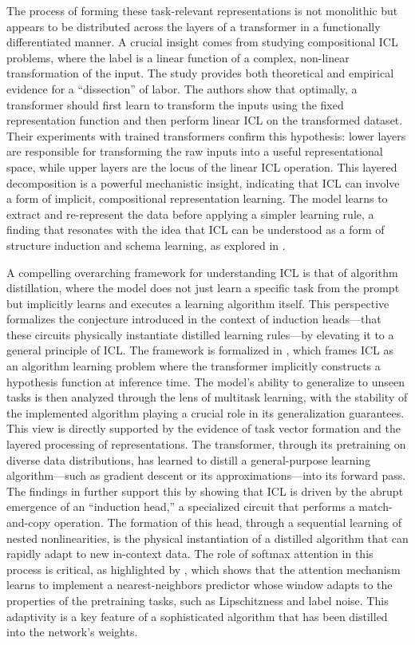 \documentclass[11pt]{article}
\begin{document}
The process of forming these task-relevant representations is not monolithic but appears to be distributed across the layers of a transformer in a functionally differentiated manner. A crucial insight comes from studying compositional ICL problems, where the label is a linear function of a complex, non-linear transformation of the input. The study \cite{ref63} provides both theoretical and empirical evidence for a ``dissection'' of labor. The authors show that optimally, a transformer should first learn to transform the inputs using the fixed representation function and then perform linear ICL on the transformed dataset. Their experiments with trained transformers confirm this hypothesis: lower layers are responsible for transforming the raw inputs into a useful representational space, while upper layers are the locus of the linear ICL operation. This layered decomposition is a powerful mechanistic insight, indicating that ICL can involve a form of implicit, compositional representation learning. The model learns to extract and re-represent the data before applying a simpler learning rule, a finding that resonates with the idea that ICL can be understood as a form of structure induction and schema learning, as explored in \cite{ref64}.

A compelling overarching framework for understanding ICL is that of algorithm distillation, where the model does not just learn a specific task from the prompt but implicitly learns and executes a learning algorithm itself. This perspective formalizes the conjecture introduced in the context of induction heads---that these circuits physically instantiate distilled learning rules---by elevating it to a general principle of ICL. The framework is formalized in \cite{ref2}, which frames ICL as an algorithm learning problem where the transformer implicitly constructs a hypothesis function at inference time. The model's ability to generalize to unseen tasks is then analyzed through the lens of multitask learning, with the stability of the implemented algorithm playing a crucial role in its generalization guarantees. This view is directly supported by the evidence of task vector formation and the layered processing of representations. The transformer, through its pretraining on diverse data distributions, has learned to distill a general-purpose learning algorithm---such as gradient descent or its approximations---into its forward pass. The findings in \cite{ref55} further support this by showing that ICL is driven by the abrupt emergence of an ``induction head,'' a specialized circuit that performs a match-and-copy operation. The formation of this head, through a sequential learning of nested nonlinearities, is the physical instantiation of a distilled algorithm that can rapidly adapt to new in-context data. The role of softmax attention in this process is critical, as highlighted by \cite{ref65}, which shows that the attention mechanism learns to implement a nearest-neighbors predictor whose window adapts to the properties of the pretraining tasks, such as Lipschitzness and label noise. This adaptivity is a key feature of a sophisticated algorithm that has been distilled into the network's weights.
\end{document}
